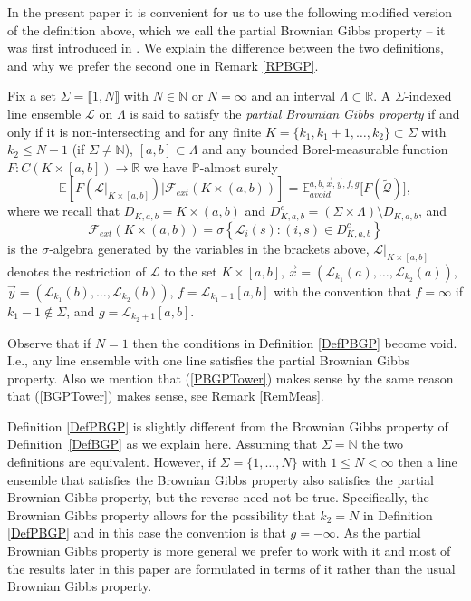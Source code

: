In the present paper it is convenient for us to use the following modified version of the definition above, which we call the partial Brownian Gibbs property -- it was first introduced in \cite{DimMat}. We explain the difference between the two definitions, and why we prefer the second one in Remark \ref{RPBGP}.
\begin{definition}\label{DefPBGP}
Fix a set $\Sigma = \llbracket 1 , N \rrbracket$ with $N \in \mathbb{N}$ or $N  = \infty$ and an interval $\Lambda \subset \mathbb{R}$.  A $\Sigma$-indexed line ensemble $\mathcal{L}$ on $\Lambda$ is said to satisfy the {\em partial Brownian Gibbs property} if and only if it is non-intersecting and for any finite $K = \{k_1, k_1 + 1, \dots, k_2 \} \subset \Sigma$ with $k_2 \leq N - 1$ (if $\Sigma \neq \mathbb{N}$), $[a,b] \subset \Lambda$ and any bounded Borel-measurable function $F: C(K \times [a,b]) \rightarrow \mathbb{R}$ we have $\mathbb{P}$-almost surely
\begin{equation}\label{PBGPTower}
\mathbb{E} \left[ F(\mathcal{L}|_{K \times [a,b]}) {\big \vert} \mathcal{F}_{ext} (K \times (a,b))  \right] =\mathbb{E}_{avoid}^{a,b, \vec{x}, \vec{y}, f, g} \bigl[ F(\tilde{\mathcal{Q}}) \bigr],
\end{equation}
where we recall that $D_{K,a,b} = K \times (a,b)$ and $D_{K,a,b}^c = (\Sigma \times \Lambda) \setminus D_{K,a,b}$, and
$$\mathcal{F}_{ext} (K \times (a,b)) = \sigma \left \{ \mathcal{L}_i(s): (i,s) \in D_{K,a,b}^c \right\}$$
is the $\sigma$-algebra generated by the variables in the brackets above, $ \mathcal{L}|_{K \times [a,b]}$ denotes the restriction of $\mathcal{L}$ to the set $K \times [a,b]$, $\vec{x} = (\mathcal{L}_{k_1}(a), \dots, \mathcal{L}_{k_2}(a))$, $\vec{y} = (\mathcal{L}_{k_1}(b), \dots, \mathcal{L}_{k_2}(b))$, $f = \mathcal{L}_{k_1 - 1}[a,b]$ with the convention that $f = \infty$ if $k_1 - 1 \not \in \Sigma$, and $g = \mathcal{L}_{k_2 +1}[a,b]$.
\end{definition}
\begin{remark} \label{BGPDeg}
Observe that if $N = 1$ then the conditions in Definition \ref{DefPBGP} become void. I.e., any line ensemble with one line satisfies the partial Brownian Gibbs property. Also we mention that (\ref{PBGPTower}) makes sense by the same reason that (\ref{BGPTower}) makes sense, see Remark \ref{RemMeas}.
\end{remark}
\begin{remark}\label{RPBGP}
Definition \ref{DefPBGP} is slightly different from the Brownian Gibbs property of Definition~\ref{DefBGP} as we explain here. Assuming that $\Sigma = \mathbb{N}$ the two definitions are equivalent. However, if $\Sigma = \{1, \dots, N\}$ with $1 \leq N < \infty$ then a line ensemble that satisfies the Brownian Gibbs property also satisfies the partial Brownian Gibbs property, but the reverse need not be true. Specifically, the Brownian Gibbs property allows for the possibility that $k_2 = N$ in Definition \ref{DefPBGP} and in this case the convention is that $g = -\infty$. As the partial Brownian Gibbs property is more general we prefer to work with it and most of the results later in this paper are formulated in terms of it rather than the usual Brownian Gibbs property.
\end{remark}


